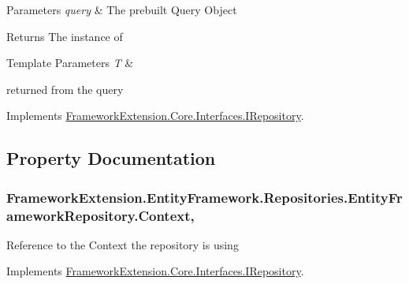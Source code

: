\begin{DoxyParams}{Parameters}
{\em query} & The prebuilt Query Object\\
\hline
\end{DoxyParams}
\begin{DoxyReturn}{Returns}
The instance of 
\begin{DoxyTemplParams}{Template Parameters}
{\em T} & \\
\hline
\end{DoxyTemplParams}
returned from the query
\end{DoxyReturn}


Implements \hyperlink{interface_framework_extension_1_1_core_1_1_interfaces_1_1_i_repository}{Framework\-Extension.\-Core.\-Interfaces.\-I\-Repository}.



\subsection{Property Documentation}
\hypertarget{class_framework_extension_1_1_entity_framework_1_1_repositories_1_1_entity_framework_repository_ac6a6a10470ba73e14d4088fe62cf50c2}{
\subsubsection[{Context}]{ Framework\-Extension.\-Entity\-Framework.\-Repositories.\-Entity\-Framework\-Repository.\-Context\hspace{0.3cm}{\ttfamily [get]}, {\ttfamily [set]}}}\label{class_framework_extension_1_1_entity_framework_1_1_repositories_1_1_entity_framework_repository_ac6a6a10470ba73e14d4088fe62cf50c2}


Reference to the Context the repository is using 



Implements \hyperlink{interface_framework_extension_1_1_core_1_1_interfaces_1_1_i_repository}{Framework\-Extension.\-Core.\-Interfaces.\-I\-Repository}.

